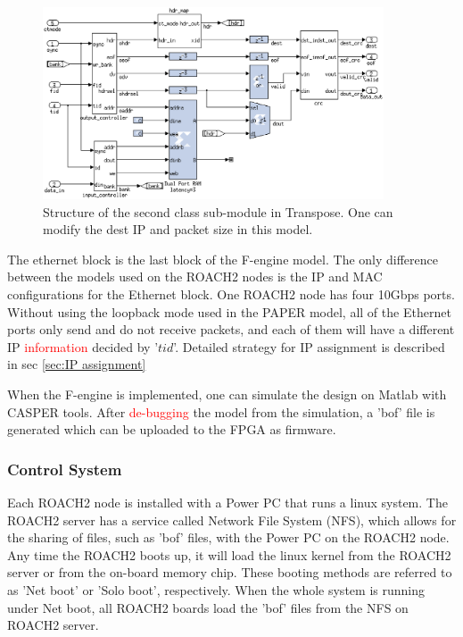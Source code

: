 \documentclass{ws-jai}
\begin{document}
\begin{figure}[t]
 \centering
 \includegraphics[width=0.9\textwidth]{./picture/transpose2.eps}
\caption{Structure of the second class sub-module in Transpose. One can modify the dest IP and packet size in this model.\label{fig:transepose2}}
\end{figure}


The ethernet block is the last block of the F-engine model. The only difference between the models used on the ROACH2 nodes is the IP and MAC configurations for the Ethernet block. One ROACH2 node has four 10Gbps ports. Without using the loopback mode used in the PAPER model, all of the Ethernet ports only send and do not receive packets, and each of them will have a different IP \textcolor{red}{information} decided by '$tid$'. Detailed strategy for IP assignment is described in sec \ref{sec:IP assignment}
	
When the F-engine is implemented, one can simulate the design on Matlab with CASPER tools. After \textcolor{red}{de-bugging} the model from the simulation, a 'bof' file is generated which can be uploaded to the FPGA as firmware.
  
\subsubsection{Control System}

	Each ROACH2 node is installed with a Power PC that runs a linux system. The ROACH2 server has a service called Network File System (NFS), which allows for the sharing of files, such as 'bof' files, with the Power PC on the ROACH2 node. Any time the ROACH2 boots up, it will load the linux kernel from the ROACH2 server or from the on-board memory chip. These booting methods are referred to as 'Net boot' or 'Solo boot', respectively. When the whole system is running under Net boot, all ROACH2 boards load the 'bof' files from the NFS on ROACH2 server. 
	
\end{document}

